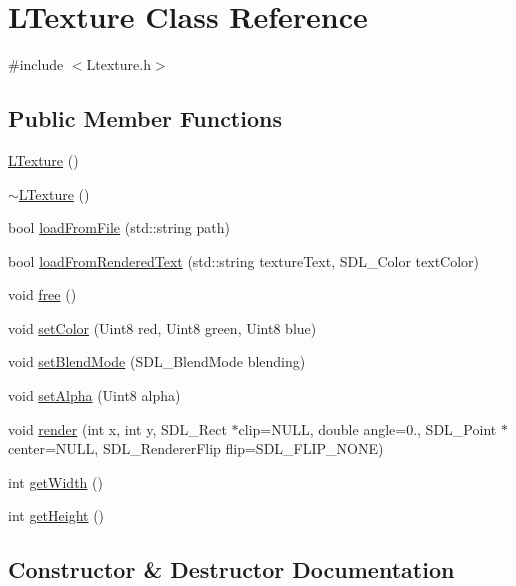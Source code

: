 \hypertarget{class_l_texture}{}\section{L\+Texture Class Reference}
\label{class_l_texture}


{\ttfamily \#include $<$Ltexture.\+h$>$}

\subsection*{Public Member Functions}
\begin{DoxyCompactItemize}
\item 
\hyperlink{class_l_texture_a12fbc9278f97388cce5ce18863b462ff}{L\+Texture} ()
\item 
\hyperlink{class_l_texture_a49cfe57c36e58ad99c1ea73fc274b77b}{$\sim$\+L\+Texture} ()
\item 
bool \hyperlink{class_l_texture_ae5b2b930a619203755988c16d6403665}{load\+From\+File} (std\+::string path)
\item 
bool \hyperlink{class_l_texture_af0ea348d6f108c45372fc5ec5b9296bc}{load\+From\+Rendered\+Text} (std\+::string texture\+Text, S\+D\+L\+\_\+\+Color text\+Color)
\item 
void \hyperlink{class_l_texture_abef558f0b920270079925548a3976a06}{free} ()
\item 
void \hyperlink{class_l_texture_a4ccf201515ecb158b137394d41ed9077}{set\+Color} (Uint8 red, Uint8 green, Uint8 blue)
\item 
void \hyperlink{class_l_texture_aa1fe07070f715bf3981c129ae1619a4e}{set\+Blend\+Mode} (S\+D\+L\+\_\+\+Blend\+Mode blending)
\item 
void \hyperlink{class_l_texture_ab4e51b54752ae7b54614078f9128a9c0}{set\+Alpha} (Uint8 alpha)
\item 
void \hyperlink{class_l_texture_af0d1f2a1562a976acc795f39e813fe95}{render} (int x, int y, S\+D\+L\+\_\+\+Rect $\ast$clip=N\+U\+LL, double angle=0., S\+D\+L\+\_\+\+Point $\ast$center=N\+U\+LL, S\+D\+L\+\_\+\+Renderer\+Flip flip=S\+D\+L\+\_\+\+F\+L\+I\+P\+\_\+\+N\+O\+NE)
\item 
int \hyperlink{class_l_texture_a542c1f81d98fd5659a04eb394d61a879}{get\+Width} ()
\item 
int \hyperlink{class_l_texture_a277f45af3dae7e35ca846a527039e59a}{get\+Height} ()
\end{DoxyCompactItemize}


\subsection{Constructor \& Destructor Documentation}
\mbox{\label{class_l_texture_a12fbc9278f97388cce5ce18863b462ff}} 
